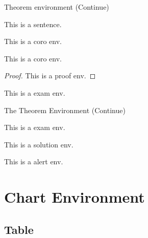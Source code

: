 \documentclass[compress,10pt,dvipsnames,notheorems]{beamer} %
\begin{document}
\begin{frame}{Theorem environment (Continue)}
	\begin{thm}\label{thm:yyy}
		This is a sentence.
	\end{thm}\vspace{\baselineskip}

	\begin{coro}
		This is a coro env.
	\end{coro}\vspace{\baselineskip}

	\begin{coro}
		This is a coro env.
	\end{coro}\vspace{\baselineskip}

	\begin{proof}
		This is a proof env.
	\end{proof}\vspace{\baselineskip}

	\begin{exam}
		This is a exam env.
	\end{exam}
\end{frame}

\begin{frame}{The Theorem Environment (Continue)}
	\begin{exam}\label{exam:zzz}
		This is a exam env.
	\end{exam}\vspace{\baselineskip}

	\begin{solu}
		This is a solution env.
	\end{solu}\vspace{\baselineskip}

	\begin{alert}
		This is a alert env.
	\end{alert}
\end{frame}


\section{Chart Environment}%

\subsection{Table}
\end{document}

